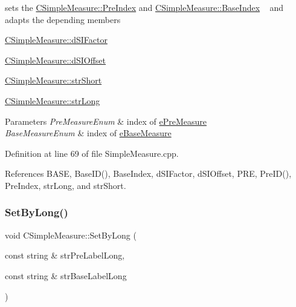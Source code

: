sets the \hyperlink{classCSimpleMeasure_aa23ed9eec21adb9a97c90a424e7ee18a}{C\+Simple\+Measure\+::\+Pre\+Index} and \hyperlink{classCSimpleMeasure_a191dbfa4cc374946bf8a82111f827d92}{C\+Simple\+Measure\+::\+Base\+Index} ~\newline
 and adapts the depending members 


\begin{DoxyItemize}
\item \hyperlink{classCSimpleMeasure_a08be520f9d3a0e50cc63693f2fc607f2}{C\+Simple\+Measure\+::d\+S\+I\+Factor}
\item \hyperlink{classCSimpleMeasure_a27c1637c744a79856ee81869e2aa8890}{C\+Simple\+Measure\+::d\+S\+I\+Offset}
\item \hyperlink{classCSimpleMeasure_a39260e6516c163955c34dce6795292ad}{C\+Simple\+Measure\+::str\+Short}
\item \hyperlink{classCSimpleMeasure_a5761fb46fb35ce577066ef1e7ec1ab2e}{C\+Simple\+Measure\+::str\+Long}
\end{DoxyItemize}


\begin{DoxyParams}{Parameters}
{\em Pre\+Measure\+Enum} & index of \hyperlink{PreMeasure_8h_a6c81167b8d4c2badde42f81cb7214620}{e\+Pre\+Measure} \\
\hline
{\em Base\+Measure\+Enum} & index of \hyperlink{BaseMeasure_8h_ac90e5164ccf1f0d648fba7e94b229a11}{e\+Base\+Measure} \\
\hline
\end{DoxyParams}


Definition at line 69 of file Simple\+Measure.\+cpp.



References B\+A\+SE, Base\+I\+D(), Base\+Index, d\+S\+I\+Factor, d\+S\+I\+Offset, P\+RE, Pre\+I\+D(), Pre\+Index, str\+Long, and str\+Short.

\mbox{\label{classCSimpleMeasure_acebe5fcf7a5aa3464d9274f14c9f312b}} 
\subsubsection{\texorpdfstring{Set\+By\+Long()}{SetByLong()}}
{\footnotesize\ttfamily void C\+Simple\+Measure\+::\+Set\+By\+Long (\begin{DoxyParamCaption}\item[{const string \&}]{str\+Pre\+Label\+Long,  }\item[{const string \&}]{str\+Base\+Label\+Long }\end{DoxyParamCaption})}



